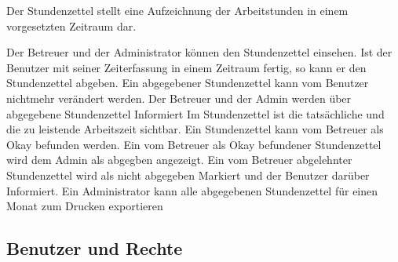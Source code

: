 \begin{requirements}
    Der Stundenzettel stellt eine Aufzeichnung der Arbeitstunden in einem vorgesetzten Zeitraum dar.
    \begin{requirements}
         Der Betreuer und der Administrator können den Stundenzettel einsehen.
         Ist der Benutzer mit seiner Zeiterfassung in einem Zeitraum fertig, so kann er den Stundenzettel abgeben.
         Ein abgegebener Stundenzettel kann vom Benutzer nichtmehr verändert werden.
         Der Betreuer und der Admin werden über abgegebene Stundenzettel Informiert
         Im Stundenzettel ist die tatsächliche und die zu leistende Arbeitszeit sichtbar.
         Ein Stundenzettel kann vom Betreuer als Okay befunden werden.
         Ein vom Betreuer als Okay befundener Stundenzettel wird dem Admin als abgegben angezeigt.
         Ein vom Betreuer abgelehnter Stundenzettel wird als nicht abgegeben Markiert und der Benutzer darüber Informiert.
         Ein Administrator kann alle abgegebenen Stundenzettel für einen Monat zum Drucken exportieren
    \end{requirements}

\end{requirements}

\subsection{Benutzer und Rechte}

